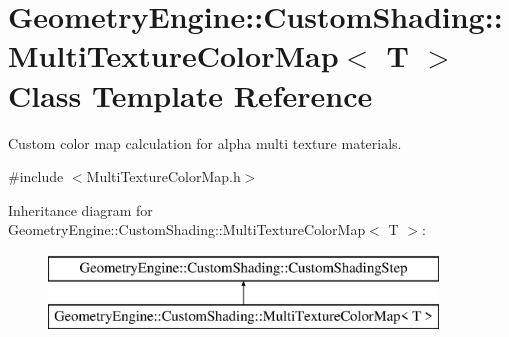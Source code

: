 \hypertarget{class_geometry_engine_1_1_custom_shading_1_1_multi_texture_color_map}{}\section{Geometry\+Engine\+::Custom\+Shading\+::Multi\+Texture\+Color\+Map$<$ T $>$ Class Template Reference}
\label{class_geometry_engine_1_1_custom_shading_1_1_multi_texture_color_map}


Custom color map calculation for alpha multi texture materials.  




{\ttfamily \#include $<$Multi\+Texture\+Color\+Map.\+h$>$}

Inheritance diagram for Geometry\+Engine\+::Custom\+Shading\+::Multi\+Texture\+Color\+Map$<$ T $>$\+:\begin{figure}[H]
\begin{center}
\leavevmode
\includegraphics[height=2.000000cm]{class_geometry_engine_1_1_custom_shading_1_1_multi_texture_color_map}
\end{center}
\end{figure}
